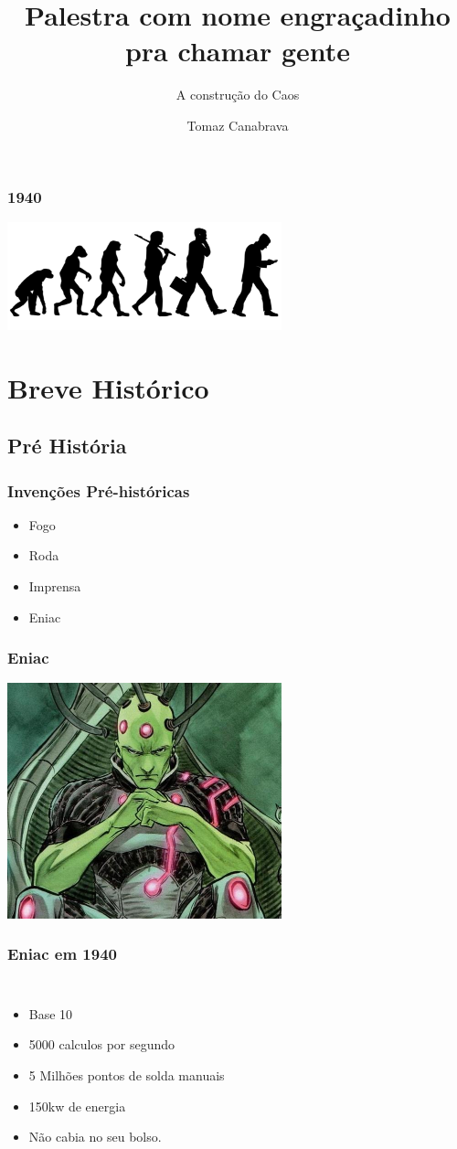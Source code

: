 \documentclass{beamer}
\title{ Palestra com nome engraçadinho pra chamar gente }
\subtitle{ A construção do Caos }
\author{ Tomaz Canabrava }
\begin{document}
\begin{frame} \titlepage \end{frame}

\begin{frame} \frametitle{1940}
    \includegraphics[width=300px]{images/evolution}
\end{frame}

\section { Breve Histórico }
\subsection{ Pré História }
\begin{frame} \frametitle{Invenções Pré-históricas}
    \begin{itemize}
     \item Fogo
     \item Roda
     \item Imprensa
     \pause
     \item Eniac
    \end{itemize}
\end{frame}

\begin{frame} \frametitle{Eniac}
    \includegraphics[width=300px]{images/eniac}
\end{frame}

\begin{frame} \frametitle{Eniac em 1940}
    \begin{columns}
    \begin{itemize}
        \item Base 10
        \pause
        \item 5000 calculos por segundo
        \pause
        \item 5 Milhões pontos de solda manuais
        \pause
        \item 150kw de energia
        \pause
        \item Não cabia no seu bolso.
    \end{itemize}
    \end{columns}
\end{frame}
\end{document}
